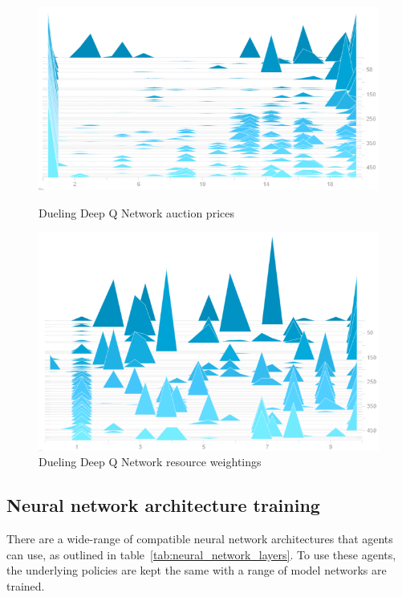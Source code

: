 \begin{figure}[h]
    \centering
    \begin{minipage}{0.5\textwidth}
        \centering
        \includegraphics[width=1.0\textwidth]{figures/4_test_eval_figs/algo_training_fig/dueling_dqn_auction_prices.png}
        \caption{Dueling Deep Q Network auction prices}
        \label{fig:dueling-dqn-auction-prices}
    \end{minipage}\hfill
    \begin{minipage}{0.5\textwidth}
        \centering
        \includegraphics[width=1.0\textwidth]{figures/4_test_eval_figs/algo_training_fig/dueling_dqn_weightings.png}
        \caption{Dueling Deep Q Network resource weightings}
        \label{fig:dueling-dqn-resource-weightings}
    \end{minipage}
\end{figure}

\subsection{Neural network architecture training}\label{subsec:neural-network-architecture-training}
There are a wide-range of compatible neural network architectures that agents can use, as outlined in
table~\ref{tab:neural_network_layers}. To use these agents, the underlying policies are kept the same with a range of
model networks are trained.

